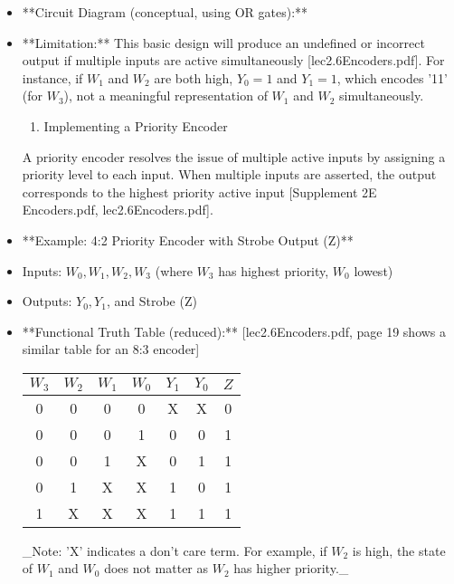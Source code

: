 \documentclass{article}
\begin{document}
\begin{itemize}
    \item **Circuit Diagram (conceptual, using OR gates):** 

    \item **Limitation:** This basic design will produce an undefined or incorrect output if multiple inputs are active simultaneously [lec2.6Encoders.pdf]. For instance, if $W_1$ and $W_2$ are both high, $Y_0=1$ and $Y_1=1$, which encodes '11' (for $W_3$), not a meaningful representation of $W_1$ and $W_2$ simultaneously.

\begin{enumerate}
\item Implementing a Priority Encoder

\end{enumerate}
A priority encoder resolves the issue of multiple active inputs by assigning a priority level to each input. When multiple inputs are asserted, the output corresponds to the highest priority active input [Supplement 2E Encoders.pdf, lec2.6Encoders.pdf].

\item **Example: 4:2 Priority Encoder with Strobe Output (Z)**

    \item Inputs: $W_0, W_1, W_2, W_3$ (where $W_3$ has highest priority, $W_0$ lowest)

    \item Outputs: $Y_0, Y_1$, and Strobe (Z)

    \item **Functional Truth Table (reduced):** [lec2.6Encoders.pdf, page 19 shows a similar table for an 8:3 encoder] \begin{tabular}{|cccc|ccc|} \\ \hline
 $W_3$ & $W_2$ & $W_1$ & $W_0$ & $Y_1$ & $Y_0$ & $Z$ \\ \hline

 0 & 0 & 0 & 0 & X & X & 0 \\ 0 & 0 & 0 & 1 & 0 & 0 & 1 \\ 0 & 0 & 1 & X & 0 & 1 & 1 \\ 0 & 1 & X & X & 1 & 0 & 1 \\ 1 & X & X & X & 1 & 1 & 1 \\ \hline

\end{tabular}

 \_Note: 'X' indicates a don't care term. For example, if $W_2$ is high, the state of $W_1$ and $W_0$ does not matter as $W_2$ has higher priority.\_


\end{itemize}
\end{document}
